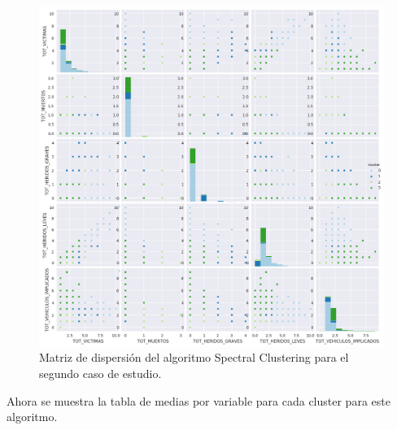 	\begin{figure}[H]
		\centering
		\includegraphics[scale=0.5]{plots/SpectralClustering-EarlyMorningAccidents-ScatterMatrix.png}
		\caption{Matriz de dispersión del algoritmo Spectral Clustering para el segundo caso de estudio.}
	\end{figure}
	
	Ahora se muestra la tabla de medias por variable para cada cluster para este algoritmo.
	
	\begin{table}[H]
		\centering
		\caption{Tabla de valores medios del algoritmo Spectral Clustering para el segundo caso de estudio.}
	\end{table}
	
